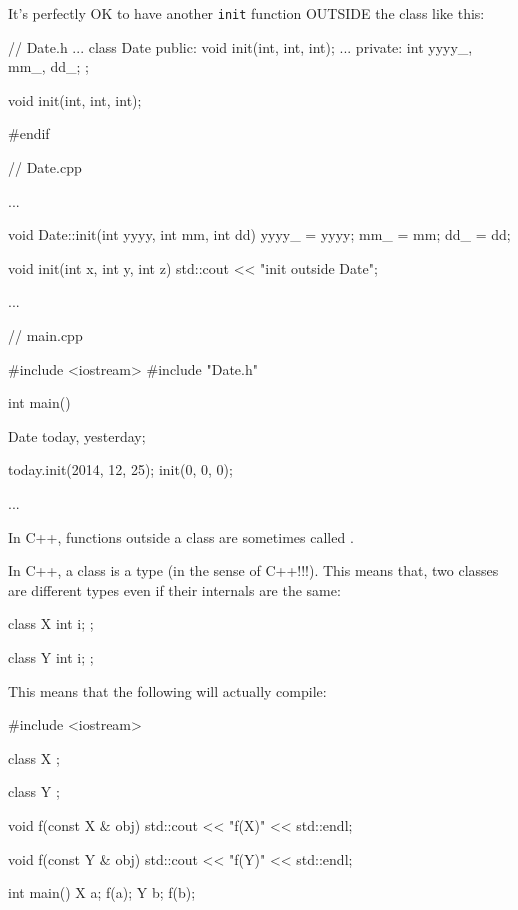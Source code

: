 It's perfectly OK to have another \texttt{init} function
OUTSIDE the class like this:

\begin{consolethree}[escapeinside=||]
// Date.h
...
class Date
{
public:
    void init(int, int, int);
    ...
private:
    int yyyy_, mm_, dd_;
};

void init(int, int, int);

#endif
\end{consolethree}

\begin{consolethree}[escapeinside=||]
// Date.cpp

...

void Date::init(int yyyy, int mm, int dd)
{
    yyyy_ = yyyy;
    mm_ = mm;
    dd_ = dd;
}

void init(int x, int y, int z)
{
    std::cout << "init outside Date\n";
}

...
\end{consolethree}

\begin{consolethree}[escapeinside=||]
// main.cpp

#include <iostream>
#include "Date.h"

int main()
{
    Date today, yesterday;

    today.init(2014, 12, 25);
    init(0, 0, 0);

    ...
}
\end{consolethree}

In C++, functions outside a class are sometimes called .



\newpage{}

In C++, a class is a type (in the sense of C++!!!). This means that, two
classes are different types even if their internals are the same:

\begin{consolethree}[escapeinside=||]
class X
{
    int i;
};

class Y
{
    int i;
};
\end{consolethree}


This means that the following will actually compile:

\begin{consolethree}[escapeinside=||]
#include <iostream>

class X
{
};

class Y
{
};

void f(const X & obj)
{
    std::cout << "f(X)" << std::endl;
}

void f(const Y & obj)
{
    std::cout << "f(Y)" << std::endl;
}

int main()
{
    X a;
    f(a);
    Y b;
    f(b);
}
\end{consolethree}

